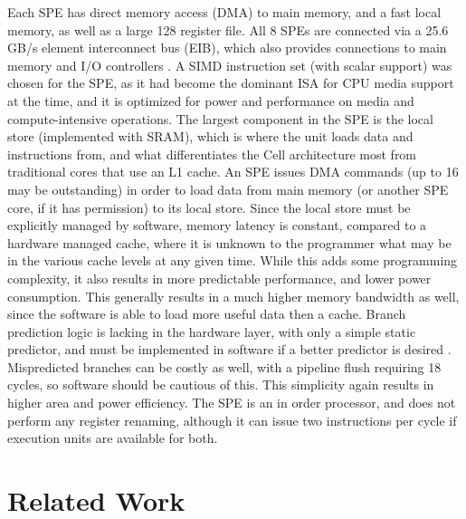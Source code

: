 \documentclass{sig-alternate-05-2015}
\begin{document}
Each SPE has direct memory access (DMA) to main memory, and a fast local memory, as well as a large 128 register file. All 8 SPEs are connected via a 25.6 GB/s element interconnect bus (EIB), which also provides connections to main memory and I/O controllers \cite{kahle2005introduction}. A SIMD instruction set (with scalar support) was chosen for the SPE, as it had become the dominant ISA for CPU media support at the time, and it is optimized for power and performance on media and compute-intensive operations.
The largest component in the SPE is the local store (implemented with SRAM), which is where the unit loads data and instructions from, and what differentiates the Cell architecture most from traditional cores that use an L1 cache. An SPE issues DMA commands (up to 16 may be outstanding) in order to load data from main memory (or another SPE core, if it has permission) to its local store. Since the local store must be explicitly managed by software, memory latency is constant, compared to a hardware managed cache, where it is unknown to the programmer what may be in the various cache levels at any given time. While this adds some programming complexity, it also results in more predictable performance, and lower power consumption. This generally results in a much higher memory bandwidth as well, since the software is able to load more useful data then a cache. Branch prediction logic is lacking in the hardware layer, with only a simple static predictor, and must be implemented in software if a better predictor is desired \cite{flachs2006microarchitecture}. Mispredicted branches can be costly as well, with a pipeline flush requiring 18 cycles, so software should be cautious of this. This simplicity again results in higher area and power efficiency. The SPE is an in order processor, and does not perform any register renaming, although it can issue two instructions per cycle if execution units are available for both.

\section{Related Work}
\end{document}
